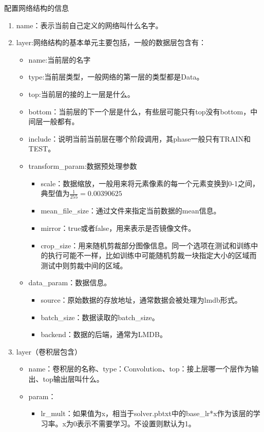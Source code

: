 配置网络结构的信息
\begin{enumerate}
	\item  name：表示当前自己定义的网络叫什么名字。
	\item  layer:网络结构的基本单元主要包括，一般的数据层包含有：
		\begin{itemize}
			\item  name:当前层的名字
			\item  type:当前层类型，一般网络的第一层的类型都是Data。
			\item  top:当前层的接的上一层是什么。
			\item  bottom：当前层的下一个层是什么，有些层可能只有top没有bottom，中间层一般都有。
			\item  include：说明当前当前层在哪个阶段调用，其phase一般只有TRAIN和TEST。
			\item  transform\_param:数据预处理参数
				\begin{itemize}
					\item scale：数据缩放，一般用来将元素像素的每一个元素变换到0-1之间，典型值为$\frac{1}{255}=0.00390625$
					\item mean\_file\_size：通过文件来指定当前数据的mean信息。
					\item mirror：true或者false，用来表示是否镜像文件。
					\item crop\_size：用来随机剪裁部分图像信息。同一个选项在测试和训练中的执行可能不一样，比如训练中可能随机剪裁一块指定大小的区域而测试中则剪裁中间的区域。
				\end{itemize}
			\item  data\_param：数据信息。
				\begin{itemize}
					\item source：原始数据的存放地址，通常数据会被处理为lmdb形式。
					\item batch\_size：数据读取的batch\_size。
					\item backend：数据的后端，通常为LMDB。
				\end{itemize}
		\end{itemize}
	\item layer（卷积层包含）
		\begin{itemize}
			\item name：卷积层的名称、type：Convolution、top：接上层哪一个层作为输出、top输出层叫什么。
			\item param：
				\begin{itemize}
					\item lr\_mult：如果值为x，相当于solver.pbtxt中的base\_lr*x作为该层的学习率。x为0表示不需要学习。不设置则默认为1。

\end{itemize}
\end{itemize}
\end{enumerate}
